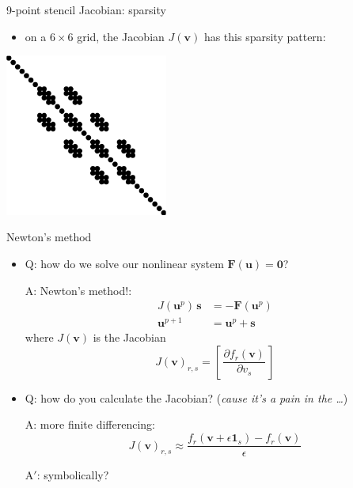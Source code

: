 \documentclass[10pt,
               svgnames,
               hyperref={colorlinks,citecolor=DeepPink4,linkcolor=FireBrick,urlcolor=Maroon},
               usepdftitle=false]{beamer}
\newcommand{\bs}{\mathbf{s}}
\newcommand{\bu}{\mathbf{u}}
\newcommand{\bv}{\mathbf{v}}
\newcommand{\bF}{\mathbf{F}}
\newcommand{\bzero}{\bm{0}}
\newcommand{\eps}{\epsilon}
\begin{document}
\begin{frame}{9-point stencil Jacobian: sparsity}
\begin{itemize}
\item on a $6\times 6$ grid, the Jacobian $J(\bv)$ has this sparsity pattern:
\end{itemize}

\bigskip\bigskip
\begin{center}
\includegraphics[width=0.4\textwidth]{images/minimal-spy.png}
\end{center}
\end{frame}


\begin{frame}{Newton's method }
\begin{itemize}
\item Q: how do we solve our nonlinear system $\bF(\bu)=\bzero$?

A: Newton's method!:
\begin{align*}
J(\bu^{p})\, \bs &= - \bF(\bu^p) \\
\bu^{p+1} &= \bu^p + \bs
\end{align*}
where $J(\bv)$ is the Jacobian
    $$J(\bv)_{r,s} = \left[\,\frac{\partial f_r(\bv)}{\partial v_s}\,\right]$$

\item<2-3> Q: how do you calculate the Jacobian?  (\emph{cause it's a pain in the \dots})

A: more finite differencing:
    $$J(\bv)_{r,s} \approx \frac{f_r(\bv + \eps \bm{1}_s) - f_r(\bv)}{\eps}$$

A$'$: symbolically?

\medskip
{}
\end{itemize}
\end{frame}
\end{document}
